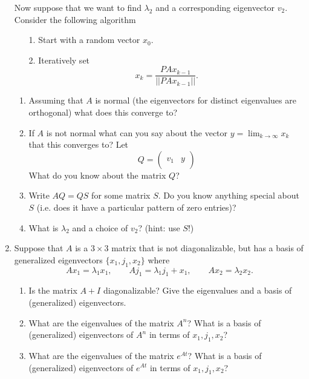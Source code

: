 \documentclass[11pt]{article}
\begin{document}
\begin{enumerate}
Now suppose that we want to find $\lambda_2$ and a corresponding eigenvector $v_2$.  Consider the following algorithm
\begin{enumerate}
\item[1.] Start with a random vector $x_0$.
\item[2.] Iteratively set
\[ x_k =  \frac{PAx_{k-1}}{||PAx_{k-1}||}. \] 
\end{enumerate}

\begin{enumerate}

\item  Assuming that $A$ is normal (the eigenvectors for distinct eigenvalues are orthogonal) what does this converge to?

\item  If $A$ is not normal what can you say about the vector $y = \lim_{k \to \infty} x_k$ that this converges to?
Let 
\[Q = \begin{pmatrix} & \\ v_1 & y \\ & \end{pmatrix} \]
What do you know about the matrix $Q$?

\item Write $AQ = QS$ for some matrix $S$.  Do you know anything special about $S$ (i.e. does it have a particular pattern of zero entries)?

\item What is $\lambda_2$ and a choice of $v_2$?  (hint: use $S$!) 


\end{enumerate}

\item Suppose that $A$ is a $3 \times 3$ matrix that is not diagonalizable, but has a basis of generalized eigenvectors $\{x_1, j_1, x_2 \}$ where
\[Ax_1  = \lambda_1 x_1, \qquad Aj_1 = \lambda_1 j_1 + x_1, \qquad Ax_2 = \lambda_2 x_2.\]

\begin{enumerate}

\item Is the matrix $A + I$ diagonalizable?  Give the eigenvalues and a basis of (generalized) eigenvectors.

\item  What are the eigenvalues of the matrix $A^n$?  What is a basis of (generalized) eigenvectors of $A^n$ in terms of $x_1, j_1, x_2$?

\item What are the eigenvalues of the matrix $e^{At}$?  What is a basis of (generalized) eigenvectors of $e^{At}$ in terms of $x_1, j_1, x_2$?

\end{enumerate}









\end{enumerate}
\end{document}
